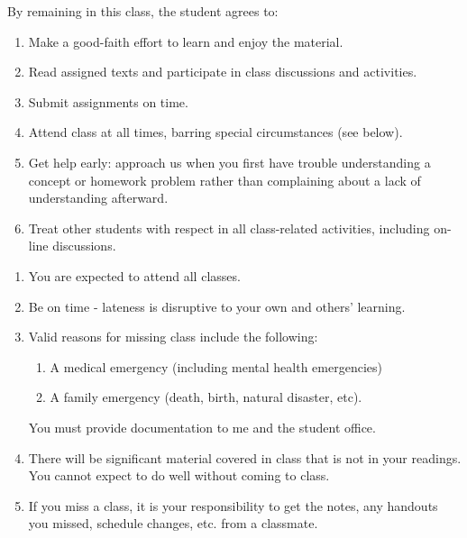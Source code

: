 \documentclass[a4paper,landscape,headrule,footrule]{foils}
\begin{document}








By remaining in this class, the student agrees to:
\begin{enumerate}
\item  Make a good-faith effort to learn and enjoy the material.
\item  Read assigned texts and participate in class discussions and activities.
\item Submit assignments on time.
\item Attend class at all times, barring special circumstances (see below).
\item Get help early: approach us when you first have trouble understanding a concept or homework problem rather than complaining about a lack of understanding afterward.
\item Treat other students with respect in all class-related activities, including on-line discussions.
\end{enumerate}
\begin{enumerate}
\item You are expected to attend all classes.
\item Be on time - lateness is disruptive to your own and others' learning.
\item Valid reasons for missing class include the following:
\begin{enumerate}
\item A medical emergency (including mental health emergencies)
\item A family emergency (death, birth, natural disaster, etc).
\end{enumerate}
You must provide documentation to me and the student office.
\item There will be significant material covered in class that is not in your readings.  You cannot expect to do well without coming to class.
\item If you miss a class, it is your responsibility to get the notes, any handouts you missed, schedule changes, etc. from a classmate.
\end{enumerate}
\end{document}
